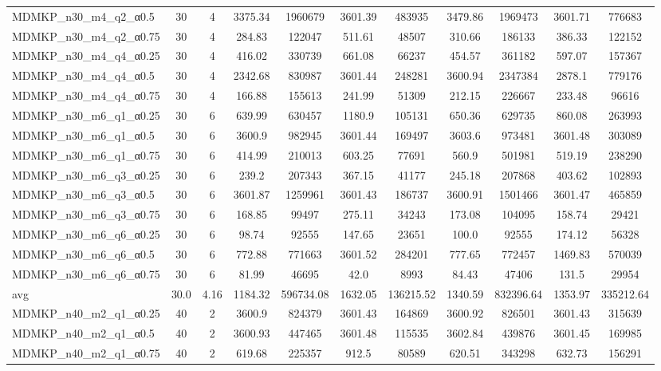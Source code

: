 \begin{table}[!ht]
\begin{tabular}{lcccccccccc}
MDMKP\_n30\_m4\_q2\_α0.5 & 30 & 4 & 3375.34 & 1960679 & 3601.39 & 483935 & 3479.86 & 1969473 & 3601.71 & 776683 \\
MDMKP\_n30\_m4\_q2\_α0.75 & 30 & 4 & 284.83 & 122047 & 511.61 & 48507 & 310.66 & 186133 & 386.33 & 122152 \\
MDMKP\_n30\_m4\_q4\_α0.25 & 30 & 4 & 416.02 & 330739 & 661.08 & 66237 & 454.57 & 361182 & 597.07 & 157367 \\
MDMKP\_n30\_m4\_q4\_α0.5 & 30 & 4 & 2342.68 & 830987 & 3601.44 & 248281 & 3600.94 & 2347384 & 2878.1 & 779176 \\
MDMKP\_n30\_m4\_q4\_α0.75 & 30 & 4 & 166.88 & 155613 & 241.99 & 51309 & 212.15 & 226667 & 233.48 & 96616 \\
MDMKP\_n30\_m6\_q1\_α0.25 & 30 & 6 & 639.99 & 630457 & 1180.9 & 105131 & 650.36 & 629735 & 860.08 & 263993 \\
MDMKP\_n30\_m6\_q1\_α0.5 & 30 & 6 & 3600.9 & 982945 & 3601.44 & 169497 & 3603.6 & 973481 & 3601.48 & 303089 \\
MDMKP\_n30\_m6\_q1\_α0.75 & 30 & 6 & 414.99 & 210013 & 603.25 & 77691 & 560.9 & 501981 & 519.19 & 238290 \\
MDMKP\_n30\_m6\_q3\_α0.25 & 30 & 6 & 239.2 & 207343 & 367.15 & 41177 & 245.18 & 207868 & 403.62 & 102893 \\
MDMKP\_n30\_m6\_q3\_α0.5 & 30 & 6 & 3601.87 & 1259961 & 3601.43 & 186737 & 3600.91 & 1501466 & 3601.47 & 465859 \\
MDMKP\_n30\_m6\_q3\_α0.75 & 30 & 6 & 168.85 & 99497 & 275.11 & 34243 & 173.08 & 104095 & 158.74 & 29421 \\
MDMKP\_n30\_m6\_q6\_α0.25 & 30 & 6 & 98.74 & 92555 & 147.65 & 23651 & 100.0 & 92555 & 174.12 & 56328 \\
MDMKP\_n30\_m6\_q6\_α0.5 & 30 & 6 & 772.88 & 771663 & 3601.52 & 284201 & 777.65 & 772457 & 1469.83 & 570039 \\
MDMKP\_n30\_m6\_q6\_α0.75 & 30 & 6 & 81.99 & 46695 & 42.0 & 8993 & 84.43 & 47406 & 131.5 & 29954 \\
\hline avg & 30.0 & 4.16 & 1184.32& 596734.08 & 1632.05& 136215.52 & 1340.59& 832396.64 & 1353.97& 335212.64\\ \hline
MDMKP\_n40\_m2\_q1\_α0.25 & 40 & 2 & 3600.9 & 824379 & 3601.43 & 164869 & 3600.92 & 826501 & 3601.43 & 315639 \\
MDMKP\_n40\_m2\_q1\_α0.5 & 40 & 2 & 3600.93 & 447465 & 3601.48 & 115535 & 3602.84 & 439876 & 3601.45 & 169985 \\
MDMKP\_n40\_m2\_q1\_α0.75 & 40 & 2 & 619.68 & 225357 & 912.5 & 80589 & 620.51 & 343298 & 632.73 & 156291 \\

\end{tabular}
\end{table}
